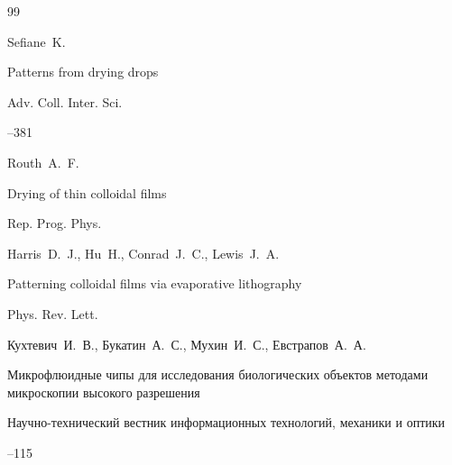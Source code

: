 \begin{thebibliography}{99}




\by Sefiane~K. 

\paper Patterns from drying drops 

\jour Adv. Coll. Inter. Sci.



--381





\by Routh~A.~F. 

\paper Drying of thin colloidal films 

\jour Rep. Prog. Phys. 









\by Harris~D.~J., Hu~H., Conrad~J.~C., Lewis~J.~A.

\paper Patterning colloidal films via evaporative lithography 

\jour Phys. Rev.  Lett. 









\by Кухтевич~И.~В., Букатин~А.~С., Мухин~И.~С., Евстрапов~А.~А.

\paper  Микрофлюидные чипы для исследования биологических объектов методами микроскопии высокого разрешения 

\jour Научно-технический вестник информационных технологий, механики и оптики




--115




\end{thebibliography}
